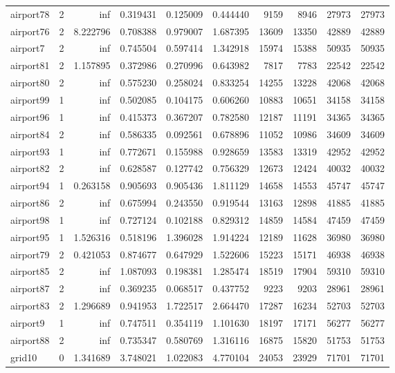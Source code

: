 \begin{longtable}{|l|r|r|r|r|r|r|r|r|r|}
airport78 & 2 & inf & 0.319431 & 0.125009 & 0.444440 & 9159 & 8946 & 27973 & 27973 \\
airport76 & 2 & 8.222796 & 0.708388 & 0.979007 & 1.687395 & 13609 & 13350 & 42889 & 42889 \\
airport7 & 2 & inf & 0.745504 & 0.597414 & 1.342918 & 15974 & 15388 & 50935 & 50935 \\
airport81 & 2 & 1.157895 & 0.372986 & 0.270996 & 0.643982 & 7817 & 7783 & 22542 & 22542 \\
airport80 & 2 & inf & 0.575230 & 0.258024 & 0.833254 & 14255 & 13228 & 42068 & 42068 \\
airport99 & 1 & inf & 0.502085 & 0.104175 & 0.606260 & 10883 & 10651 & 34158 & 34158 \\
airport96 & 1 & inf & 0.415373 & 0.367207 & 0.782580 & 12187 & 11191 & 34365 & 34365 \\
airport84 & 2 & inf & 0.586335 & 0.092561 & 0.678896 & 11052 & 10986 & 34609 & 34609 \\
airport93 & 1 & inf & 0.772671 & 0.155988 & 0.928659 & 13583 & 13319 & 42952 & 42952 \\
airport82 & 2 & inf & 0.628587 & 0.127742 & 0.756329 & 12673 & 12424 & 40032 & 40032 \\
airport94 & 1 & 0.263158 & 0.905693 & 0.905436 & 1.811129 & 14658 & 14553 & 45747 & 45747 \\
airport86 & 2 & inf & 0.675994 & 0.243550 & 0.919544 & 13163 & 12898 & 41885 & 41885 \\
airport98 & 1 & inf & 0.727124 & 0.102188 & 0.829312 & 14859 & 14584 & 47459 & 47459 \\
airport95 & 1 & 1.526316 & 0.518196 & 1.396028 & 1.914224 & 12189 & 11628 & 36980 & 36980 \\
airport79 & 2 & 0.421053 & 0.874677 & 0.647929 & 1.522606 & 15223 & 15171 & 46938 & 46938 \\
airport85 & 2 & inf & 1.087093 & 0.198381 & 1.285474 & 18519 & 17904 & 59310 & 59310 \\
airport87 & 2 & inf & 0.369235 & 0.068517 & 0.437752 & 9223 & 9203 & 28961 & 28961 \\
airport83 & 2 & 1.296689 & 0.941953 & 1.722517 & 2.664470 & 17287 & 16234 & 52703 & 52703 \\
airport9 & 1 & inf & 0.747511 & 0.354119 & 1.101630 & 18197 & 17171 & 56277 & 56277 \\
airport88 & 2 & inf & 0.735347 & 0.580769 & 1.316116 & 16875 & 15820 & 51753 & 51753 \\
grid10 & 0 & 1.341689 & 3.748021 & 1.022083 & 4.770104 & 24053 & 23929 & 71701 & 71701 \\

\end{longtable}
